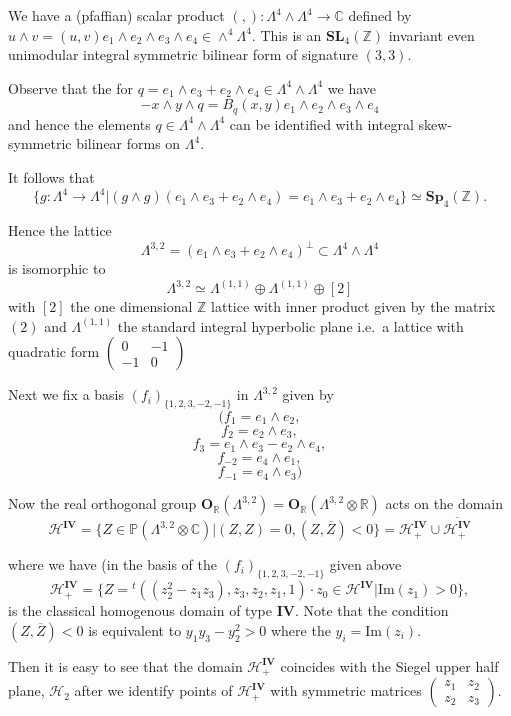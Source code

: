 \documentclass[9pt]{amsart} \usepackage[utf8]{inputenc}
\newcommand{\Imag}{\mathrm{Im}}
\newcommand{\Proj}{\mathbb{P}}
\newcommand{\Z}{\mathbb{Z}} \newcommand{\C}{\mathbb{C}}
\newcommand{\R}{\mathbb{R}} \newcommand{\La}{\Lambda}
\newcommand{\HypPlan}{\Lambda^{(1,1)}}
\newcommand{\Sp}{\mathbf{Sp}}
\newcommand{\SL}{\mathbf{SL}}
\newcommand{\Orth}{\mathbf{O}}
\newcommand{\Hpl}{\mathcal{H}}
\newcommand{\IV}{\mathbf{IV}}
\newcommand{\fbasis}{(f_i)_{\{1,2,3,-2,-1\}}}
\begin{document}
We have a (pfaffian) scalar product
$(,): \La^4 \wedge \La^4 \rightarrow \C$ defined by $u \wedge v =
(u,v)e_1 \wedge e_2 \wedge e_3 \wedge e_4 \in \wedge^4 \La^4$.  This is
an $\SL_4(\Z)$ invariant even unimodular integral symmetric bilinear
form of signature $(3,3)$.

Observe that the for $q = e_1\wedge e_3 + e_2 \wedge e_4 \in \La^4
\wedge \La^4$ we have $$-x \wedge y \wedge q = B_q(x,y) e_1 \wedge e_2
\wedge e_3 \wedge e_4$$ and hence the elements $q \in \La^4 \wedge
\La^4$ can be identified with integral skew-symmetric bilinear forms on
$\La^4$.


It follows that $$ \{ g : \La^4 \rightarrow \La^4 | (g \wedge g)(e_1
\wedge e_3 + e_2 \wedge e_4) = e_1 \wedge e_3 + e_2 \wedge e_4 \} \simeq
\Sp_4(\Z).$$

Hence the lattice $$\La^{3,2} = (e_1 \wedge e_3 + e_2 \wedge e_4)^{\perp}
\subset \La^4 \wedge \La^4$$ is isomorphic to $$\La^{3,2} \simeq \HypPlan \oplus \HypPlan \oplus [2]$$
with $[2]$ the one dimensional $\Z$ lattice with inner product given by
the matrix $(2)$ and $\HypPlan$ the standard integral hyperbolic plane i.e.\ a lattice with
quadratic form $\begin{pmatrix}0 & -1\\ -1 & 0\end{pmatrix}$

Next we fix a basis $\fbasis$ in $\La^{3,2}$ given by
$$ (f_1 = e_1 \wedge e_2,$$
$$ f_2 = e_2 \wedge e_3,$$
$$ f_3 = e_1 \wedge e_3 - e_2 \wedge e_4, $$
$$ f_{-2} = e_4 \wedge e_1, $$
$$ f_{-1} = e_4 \wedge e_3)$$

Now the real orthogonal group $\Orth_{\R}(\La^{3,2}) =
\Orth_{\R}(\La^{3,2}\otimes \R)$ acts on the domain $$\Hpl^{\IV} = \{ Z \in
\Proj(\La^{3,2} \otimes \C) | (Z,Z) = 0, (Z, \overline{Z}) < 0\} = \Hpl_+^{\IV}
\cup \overline{\Hpl^{\IV}_+}$$

where we have (in the basis of the $\fbasis$ given above
$$\Hpl_+^{\IV} = \{ Z = {}^t((z_2^2 - z_1 z_3), z_3, z_2, z_1, 1)\cdot z_0
\in \Hpl^{\IV} |\Imag(z_1) > 0 \},$$ is the classical homogenous domain
of type $\IV$. Note that the condition $(Z,\overline{Z})<0$ is equivalent to $y_1 y_3 -
y_2^2 > 0$ where the $y_i = \Imag(z_i)$.

Then it is easy to see that the domain $\Hpl_+^{\IV}$ coincides with the
Siegel upper half plane, $\Hpl_2$ after we identify points of
$\Hpl_+^{\IV}$ with symmetric matrices $\begin{pmatrix} z_1 & z_2\\ z_2 &
z_3\end{pmatrix}$.
\end{document}
